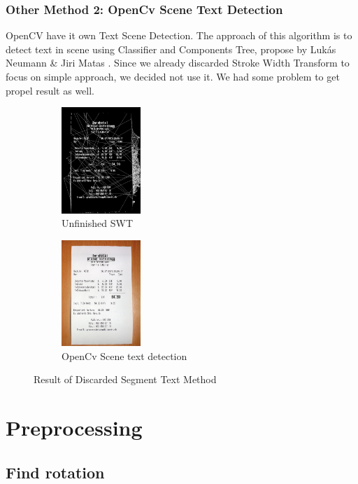 \documentclass[Report.tex]{subfiles}
\begin{document}
\begin{flushleft}
  \subsubsection{Other Method 2: OpenCv Scene Text Detection}
  OpenCV have it own Text Scene Detection. The approach of this algorithm is to detect text in scene using Classifier and Components Tree, propose by Lukás Neumann \& Jiri Matas \cite{neumann_real-time_2012}. Since we already discarded Stroke Width Transform to focus on simple approach, we decided not use it. We had some problem to get propel result as well.
\end{flushleft}

\begin{figure}[ht]
  \centering
  \begin{subfigure}[t]{4cm}
    \includegraphics[width=3cm]{res/swt.png}
    \caption{Unfinished SWT}
  \end{subfigure}
  \hspace{5mm}%
  \begin{subfigure}[t]{4cm}
    \includegraphics[width=3cm]{res/OpenCV_Std.png}
    \caption{OpenCv Scene text detection}
  \end{subfigure}
  \hspace{5mm}%
  \caption{Result of Discarded Segment Text Method}
  \label{fig:Text_detection_result}
\end{figure}

\section{Preprocessing}
\subsection{Find rotation}
\end{document}
